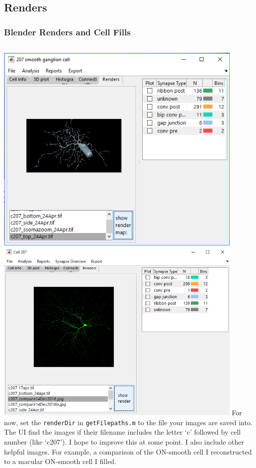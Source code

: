 \documentclass[11pt]{beamer}
\begin{document}
\subsection{Renders}
\begin{frame}
	\frametitle{Blender Renders and Cell Fills}
	\begin{columns}
		\includegraphics[width=0.9\textwidth]{c207_render}
		\hskip10pt
		\includegraphics[width=0.9\textwidth]{c207_cellfill}
		For now, set the \texttt{renderDir} in \texttt{getFilepaths.m} to the file your images are saved into. The UI find the images if their filename includes the letter `c' followed by cell number (like `c207'). I hope to improve this at some point.
		\vskip15pt
		I also include other helpful images. For example, a comparison of the ON-smooth cell I reconstructed to a macular ON-smooth cell I filled.
	\end{columns}
\end{frame}
\end{document}
